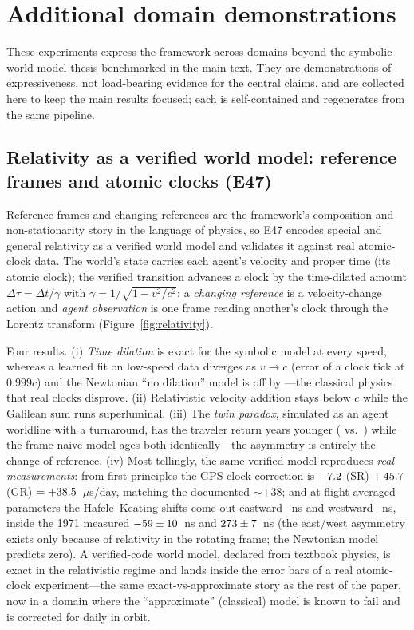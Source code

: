 \documentclass[11pt]{article}
\begin{document}


\section{Additional domain demonstrations}\label{app:domains}
These experiments express the framework across domains beyond the symbolic-world-model thesis benchmarked in the main text. They are demonstrations of expressiveness, not load-bearing evidence for the central claims, and are collected here to keep the main results focused; each is self-contained and regenerates from the same pipeline.

\subsection{Relativity as a verified world model: reference frames and atomic clocks (E47)}\label{sec:relativity}
Reference frames and changing references are the framework's composition and
non-stationarity story in the language of physics, so E47 encodes special and
general relativity as a verified world model and validates it against real
atomic-clock data. The world's state carries each agent's velocity and proper
time (its atomic clock); the verified transition advances a clock by the
time-dilated amount $\Delta\tau=\Delta t/\gamma$ with
$\gamma=1/\sqrt{1-v^2/c^2}$; a \emph{changing reference} is a velocity-change
action and \emph{agent observation} is one frame reading another's clock through
the Lorentz transform (Figure~\ref{fig:relativity}).

Four results. (i) \emph{Time dilation} is exact for the symbolic model at every
speed, whereas a learned fit on low-speed data diverges as $v\to c$ (error
\RelLearnErr{} of a clock tick at $0.999c$) and the Newtonian ``no dilation''
model is off by \RelNewtErr---the classical physics that real clocks disprove.
(ii) Relativistic velocity addition stays below $c$ while the Galilean sum runs
superluminal. (iii) The \emph{twin paradox}, simulated as an agent worldline with
a turnaround, has the traveler return \RelTwinDiff{} years younger
(\RelTwinTravel{} vs.\ \RelTwinStay{}) while the frame-naive model ages both
identically---the asymmetry is entirely the change of reference. (iv) Most
tellingly, the same verified model reproduces \emph{real measurements}: from
first principles the GPS clock correction is $-7.2$ (SR) $+\,45.7$ (GR)
$=+38.5$~$\mu$s/day, matching the documented $\sim$+38; and at
flight-averaged parameters the Hafele--Keating shifts come out eastward
\RelHKModelEast~ns and westward \RelHKModelWest~ns, inside the 1971 measured
$-59\pm10$~ns and $273\pm7$~ns (the east/west asymmetry exists only
because of relativity in the rotating frame; the Newtonian model predicts zero).
A verified-code world model, declared from textbook physics, is exact in the
relativistic regime and lands inside the error bars of a real atomic-clock
experiment---the same exact-vs-approximate story as the rest of the paper, now in
a domain where the ``approximate'' (classical) model is known to fail and is
corrected for daily in orbit.
\end{document}
